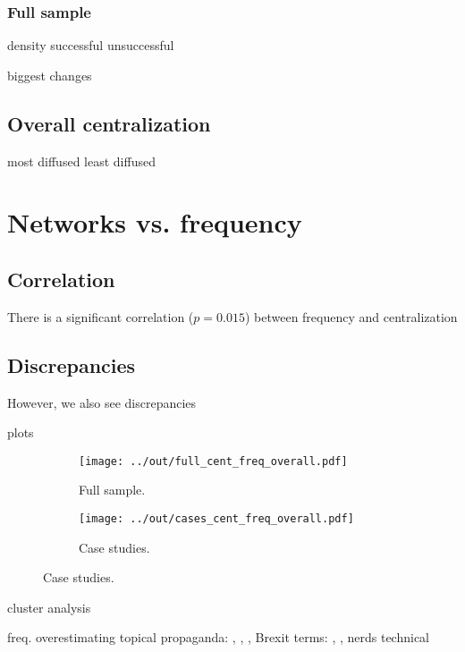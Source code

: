 \documentclass[draft, a4paper, abstract=on]{scrartcl}
\begin{document}
      \subsubsection{Full sample}

  density
  successful
  unsuccessful

  biggest changes

    \subsection{Overall centralization}

  most diffused
  least diffused

  \section{Networks vs. frequency}

    \subsection{Correlation}

  There is a significant correlation ($p = 0.015$) between frequency and centralization

    \subsection{Discrepancies}

  However, we also see discrepancies

  plots

  \begin{figure}[H]
  \centering
  \begin{subfigure}{.45\linewidth}
  \caption{Full sample.}
  \centering
  \texttt{[image: ../out/full\_cent\_freq\_overall.pdf]}
  \end{subfigure}
  \begin{subfigure}{.45\linewidth}
  \caption{Case studies.}
  \centering
  \texttt{[image: ../out/cases\_cent\_freq\_overall.pdf]}
  \end{subfigure}
  \end{figure}

  cluster analysis

  freq. overestimating
  topical
  propaganda: , , , 
  Brexit terms: , , 
  nerds
  technical
\end{document}
